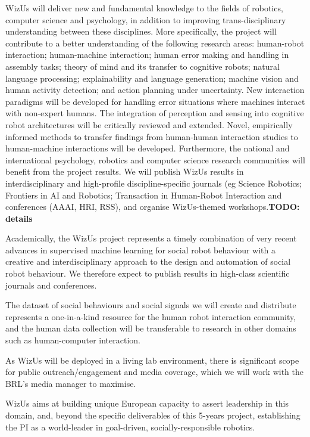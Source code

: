 \documentclass[11pt,a4paper]{report}
\newcommand{\project}{WizUs\xspace}
\newcommand{\TODO}[1]{{\color{red}\textbf{TODO: #1}}}
\begin{document}
\project will deliver new and fundamental knowledge to the fields of robotics,
computer science and psychology, in addition to improving trans-disciplinary
understanding between these disciplines. More specifically, the project will
contribute to a better understanding of the following research areas:
human-robot interaction; human-machine interaction; human error making and
handling in assembly tasks; theory of mind and its transfer to cognitive robots;
natural language processing; explainability and language generation; machine
vision and human activity detection; and action planning under uncertainty. New
interaction paradigms will be developed for handling error situations where
machines interact with non-expert humans. The integration of perception and
sensing into cognitive robot architectures will be critically reviewed and
extended. Novel, empirically informed methods to transfer findings from
human-human interaction studies to human-machine interactions will be developed.
Furthermore, the national and international psychology, robotics and computer
science research communities will benefit from the project results. We will
publish \project results in interdisciplinary and high-profile discipline-specific journals
(eg Science Robotics; Frontiers in AI and Robotics; Transaction in Human-Robot Interaction
and conferences (AAAI, HRI, RSS), and organise \project-themed
workshops.\TODO{details}



Academically, the \project project represents a timely combination of
very recent advances in supervised machine learning for social robot
behaviour with a creative and interdisciplinary approach to the design
and automation of social robot behaviour. We therefore expect to publish
results in high-class scientific journals and conferences.

The dataset of social behaviours and social signals we will create and
distribute represents a one-in-a-kind resource for the human robot
interaction community, and the human data collection will be
transferable to research in other domains such as human-computer
interaction.

As \project will be deployed in a living lab environment, there is
significant scope for public outreach/engagement and media coverage,
which we will work with the BRL's media manager to maximise.



\project aims at building unique European capacity to assert leadership in this
domain, and, beyond the specific deliverables of this 5-years project,
establishing the PI as a world-leader in goal-driven, socially-responsible
robotics.
\end{document}
